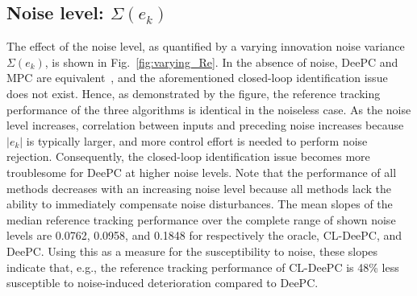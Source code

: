 \subsection{Noise level: $\Sigma(e_k)$}
\noindent The effect of the noise level, as quantified by a varying innovation noise variance $\Sigma(e_k)$, is shown in Fig.~\ref{fig:varying_Re}. In the absence of noise, \ac{DeePC} and \ac{MPC} are equivalent~\cite{Coulson2019}, and the aforementioned closed-loop identification issue does not exist. Hence, as demonstrated by the figure, the reference tracking performance of the three algorithms is identical in the noiseless case. As the noise level increases, correlation between inputs and preceding noise increases because $|e_k|$ is typically larger, and more control effort is needed to perform noise rejection. Consequently, the closed-loop identification issue becomes more troublesome for \ac{DeePC} at higher noise levels. Note that the performance of all methods decreases with an increasing noise level because all methods lack the ability to immediately compensate noise disturbances. The mean slopes of the median reference tracking performance over the complete range of shown noise levels are 0.0762, 0.0958, and 0.1848 for respectively the oracle, \ac{CL-DeePC}, and \ac{DeePC}. Using this as a measure for the susceptibility to noise, these slopes indicate that, e.g., the reference tracking performance of \ac{CL-DeePC} is 48\% less susceptible to noise-induced deterioration compared to \ac{DeePC}.
